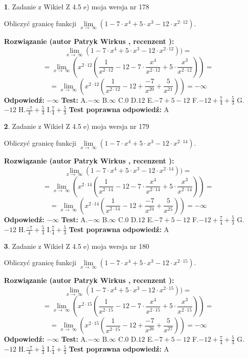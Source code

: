 \documentclass[12pt, a4paper]{article}
\theoremstyle{definition} %
\newtheorem{zad}{}
\newcommand{\zadStart}[1]{\begin{zad}#1\newline}
\newcommand{\zadStop}{\end{zad}}
\newcommand{\rozwStart}[2]{\noindent \textbf{Rozwiązanie (autor #1 , recenzent #2): }\newline}
\newcommand{\rozwStop}{\newline}
\newcommand{\odpStart}{\noindent \textbf{Odpowiedź:}\newline}
\newcommand{\odpStop}{\newline}
\newcommand{\testStart}{\noindent \textbf{Test:}\newline}
\newcommand{\testStop}{\newline}
\newcommand{\kluczStart}{\noindent \textbf{Test poprawna odpowiedź:}\newline}
\newcommand{\kluczStop}{\newline}
\begin{document}
\zadStart{Zadanie z Wikieł Z 4.5 e) moja wersja nr 178}



Obliczyć granicę funkcji  $\lim\limits_{x\to\ \infty}(1 - 7 \cdot x^{4}+5 \cdot x^{3}- 12 \cdot x^{2\cdot12})$.
\zadStop
\rozwStart{Patryk Wirkus}{}
$$\lim\limits_{x\to\ \infty}(1 - 7 \cdot x^{4}+5 \cdot x^{3}- 12 \cdot x^{2\cdot12}))=$$
$$=\lim\limits_{x\to\ \infty}(x^{2\cdot12}(\frac{1}{x^{2\cdot12}}-12 -7 \cdot \frac{x^{4}}{x^{2\cdot12}}+5 \cdot \frac{x^{3}}{x^{2\cdot12}}))=$$
$$=\lim\limits_{x\to\ \infty}(x^{2\cdot12}(\frac{1}{x^{2\cdot12}}-12 + \frac{-7}{x^{20}}+ \frac{5}{x^{21}}))=-\infty$$
\rozwStop
\odpStart
$-\infty$
\odpStop
\testStart
A.$-\infty$ B.$\infty$ C.$0$ D.$12$ E.$-7 + 5 - 12$
F.$-12+\frac{7}{4}+\frac{5}{3}$ G.$-12$
H.$\frac{-7}{4}+\frac{5}{3}$
I.$\frac{7}{4}+\frac{5}{3}$
\testStop
\kluczStart
A
\kluczStop



\zadStart{Zadanie z Wikieł Z 4.5 e) moja wersja nr 179}



Obliczyć granicę funkcji  $\lim\limits_{x\to\ \infty}(1 - 7 \cdot x^{4}+5 \cdot x^{3}- 12 \cdot x^{2\cdot14})$.
\zadStop
\rozwStart{Patryk Wirkus}{}
$$\lim\limits_{x\to\ \infty}(1 - 7 \cdot x^{4}+5 \cdot x^{3}- 12 \cdot x^{2\cdot14}))=$$
$$=\lim\limits_{x\to\ \infty}(x^{2\cdot14}(\frac{1}{x^{2\cdot14}}-12 -7 \cdot \frac{x^{4}}{x^{2\cdot14}}+5 \cdot \frac{x^{3}}{x^{2\cdot14}}))=$$
$$=\lim\limits_{x\to\ \infty}(x^{2\cdot14}(\frac{1}{x^{2\cdot14}}-12 + \frac{-7}{x^{24}}+ \frac{5}{x^{25}}))=-\infty$$
\rozwStop
\odpStart
$-\infty$
\odpStop
\testStart
A.$-\infty$ B.$\infty$ C.$0$ D.$12$ E.$-7 + 5 - 12$
F.$-12+\frac{7}{4}+\frac{5}{3}$ G.$-12$
H.$\frac{-7}{4}+\frac{5}{3}$
I.$\frac{7}{4}+\frac{5}{3}$
\testStop
\kluczStart
A
\kluczStop



\zadStart{Zadanie z Wikieł Z 4.5 e) moja wersja nr 180}



Obliczyć granicę funkcji  $\lim\limits_{x\to\ \infty}(1 - 7 \cdot x^{4}+5 \cdot x^{3}- 12 \cdot x^{2\cdot15})$.
\zadStop
\rozwStart{Patryk Wirkus}{}
$$\lim\limits_{x\to\ \infty}(1 - 7 \cdot x^{4}+5 \cdot x^{3}- 12 \cdot x^{2\cdot15}))=$$
$$=\lim\limits_{x\to\ \infty}(x^{2\cdot15}(\frac{1}{x^{2\cdot15}}-12 -7 \cdot \frac{x^{4}}{x^{2\cdot15}}+5 \cdot \frac{x^{3}}{x^{2\cdot15}}))=$$
$$=\lim\limits_{x\to\ \infty}(x^{2\cdot15}(\frac{1}{x^{2\cdot15}}-12 + \frac{-7}{x^{26}}+ \frac{5}{x^{27}}))=-\infty$$
\rozwStop
\odpStart
$-\infty$
\odpStop
\testStart
A.$-\infty$ B.$\infty$ C.$0$ D.$12$ E.$-7 + 5 - 12$
F.$-12+\frac{7}{4}+\frac{5}{3}$ G.$-12$
H.$\frac{-7}{4}+\frac{5}{3}$
I.$\frac{7}{4}+\frac{5}{3}$
\testStop
\kluczStart
A
\kluczStop
\end{document}

